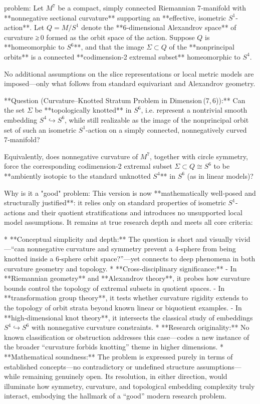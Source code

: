 problem:  
Let \( M^7 \) be a compact, simply connected Riemannian 7‑manifold with **nonnegative sectional curvature** supporting an **effective, isometric \( S^1 \)-action**.  
Let \( Q = M / S^1 \) denote the **6‑dimensional Alexandrov space** of curvature ≥ 0 formed as the orbit space of the action.  Suppose \( Q \) is **homeomorphic to \( S^6 \)**, and that the image \( \Sigma \subset Q \) of the **nonprincipal orbits** is a connected **codimension‑2 extremal subset** homeomorphic to \( S^4 \).  

No additional assumptions on the slice representations or local metric models are imposed—only what follows from standard equivariant and Alexandrov geometry.

**Question (Curvature–Knotted Stratum Problem in Dimension (7, 6)):**  
Can the set \( \Sigma \) be **topologically knotted** in \( S^6 \), i.e. represent a nontrivial smooth embedding \( S^4 \hookrightarrow S^6 \), while still realizable as the image of the nonprincipal orbit set of such an isometric \( S^1 \)-action on a simply connected, nonnegatively curved 7‑manifold?  

Equivalently, does nonnegative curvature of \( M^7 \), together with circle symmetry, force the corresponding codimension‑2 extremal subset \( \Sigma \subset Q \cong S^6 \) to be **ambiently isotopic to the standard unknotted \( S^4 \)** in \( S^6 \) (as in linear models)?  

Why is it a "good" problem:  
This version is now **mathematically well‑posed and structurally justified**: it relies only on standard properties of isometric \( S^1 \)-actions and their quotient stratifications and introduces no unsupported local model assumptions. It remains at true research depth and meets all core criteria:

* **Conceptual simplicity and depth:** The question is short and visually vivid—“can nonnegative curvature and symmetry prevent a 4‑sphere from being knotted inside a 6‑sphere orbit space?”—yet connects to deep phenomena in both curvature geometry and topology.
* **Cross‑disciplinary significance:**  
  - In **Riemannian geometry** and **Alexandrov theory**, it probes how curvature bounds control the topology of extremal subsets in quotient spaces.  
  - In **transformation group theory**, it tests whether curvature rigidity extends to the topology of orbit strata beyond known linear or biquotient examples.  
  - In **high‑dimensional knot theory**, it intersects the classical study of embeddings \( S^4 \hookrightarrow S^6 \) with nonnegative curvature constraints.
* **Research originality:** No known classification or obstruction addresses this case—codes a new instance of the broader “curvature forbids knotting” theme in higher dimensions.
* **Mathematical soundness:** The problem is expressed purely in terms of established concepts—no contradictory or undefined structure assumptions—while remaining genuinely open.  
Its resolution, in either direction, would illuminate how symmetry, curvature, and topological embedding complexity truly interact, embodying the hallmark of a “good” modern research problem.